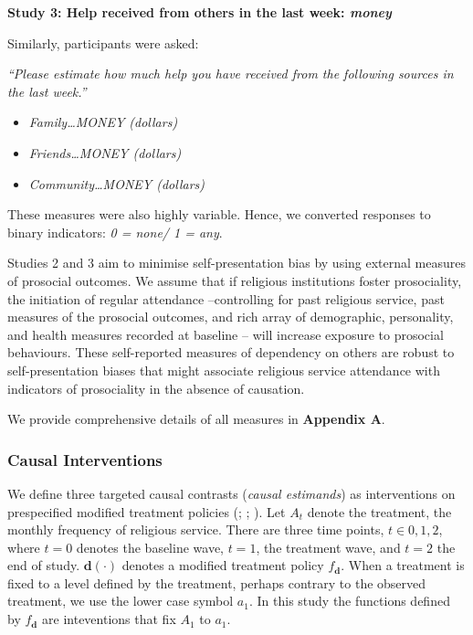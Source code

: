\documentclass[
  single column]{article}
\providecommand{\tightlist}{%
  \setlength{\itemsep}{0pt}\setlength{\parskip}{0pt}}\usepackage{longtable,booktabs,array}
\begin{document}
\textbf{Study 3: Help received from others in the last week:
\emph{money} }

Similarly, participants were asked:

\emph{``Please estimate how much help you have received from the
following sources in the last week.''}

\begin{itemize}
\tightlist
\item
  \emph{Family\ldots MONEY (dollars)}
\item
  \emph{Friends\ldots MONEY (dollars)}
\item
  \emph{Community\ldots MONEY (dollars)}
\end{itemize}

These measures were also highly variable. Hence, we converted responses
to binary indicators: \emph{0 = none/ 1 = any}.

Studies 2 and 3 aim to minimise self-presentation bias by using external
measures of prosocial outcomes. We assume that if religious institutions
foster prosociality, the initiation of regular attendance --controlling
for past religious service, past measures of the prosocial outcomes, and
rich array of demographic, personality, and health measures recorded at
baseline -- will increase exposure to prosocial behaviours. These
self-reported measures of dependency on others are robust to
self-presentation biases that might associate religious service
attendance with indicators of prosociality in the absence of causation.

We provide comprehensive details of all measures in \textbf{Appendix A}.

\subsubsection{Causal Interventions}\label{causal-interventions}

We define three targeted causal contrasts (\emph{causal estimands}) as
interventions on prespecified modified treatment policies
(;
;
). Let
\(A_t\) denote the treatment, the monthly frequency of religious
service. There are three time points, \(t\in{0,1,2}\), where \(t=0\)
denotes the baseline wave, \(t=1\), the treatment wave, and \(t=2\) the
end of study. \(\mathbf{d}(\cdot)\) denotes a modified treatment policy
\(f_\mathbf{d}\). When a treatment is fixed to a level defined by the
treatment, perhaps contrary to the observed treatment, we use the lower
case symbol \(a_1\). In this study the functions defined by
\(f_\mathbf{d}\) are inteventions that fix \(A_1\) to \(a_1\).
\end{document}
